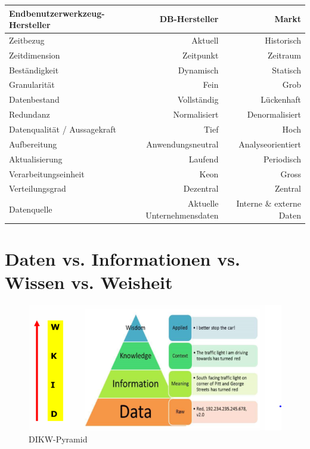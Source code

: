 \documentclass[a4paper, 11pt]{article}
\begin{document}
\begin{landscape}
\begin{tabular}[htbp]{|l|r|r|}
		\hline
		Endbenutzerwerkzeug-Hersteller & DB-Hersteller & Markt \\
		\hline
		Zeitbezug & Aktuell & Historisch \\ 
		\hline
		Zeitdimension & Zeitpunkt & Zeitraum \\
		\hline
		Beständigkeit & Dynamisch & Statisch \\
		\hline
		Granularität & Fein & Grob \\
		\hline
		Datenbestand & Vollständig & Lückenhaft \\
		\hline
		Redundanz & Normalisiert & Denormalisiert \\
		\hline
		Datenqualität / Aussagekraft & Tief & Hoch \\
		\hline
		Aufbereitung & Anwendungsneutral & Analyseorientiert \\
		\hline
		Aktualisierung & Laufend & Periodisch \\
		\hline
		Verarbeitungseinheit & Keon & Gross \\
		\hline
		Verteilungsgrad & Dezentral & Zentral \\
		\hline
		Datenquelle & Aktuelle Unternehmensdaten & Interne \& externe Daten \\
		\hline
	\end{tabular} 
	\end{landscape}

\restoregeometry

\section{Daten vs. Informationen vs. Wissen vs. Weisheit}

\begin{figure}[htb]
	\centering
	\includegraphics[keepaspectratio=true,height=15\baselineskip]{DIWW.PNG}
	\caption{DIKW-Pyramid}
	\label{fig:dikw}
\end{figure}
\end{document}
